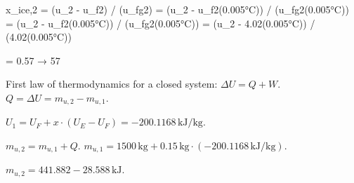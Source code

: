 x_ice,2 = (u_2 - u_f2) / (u_fg2)  
= (u_2 - u_f2(0.005°C)) / (u_fg2(0.005°C))  
= (u_2 - u_f2(0.005°C)) / (u_fg2(0.005°C))  
= (u_2 - 4.02(0.005°C)) / (4.02(0.005°C))  

= 0.57 → 57%

First law of thermodynamics for a closed system: \( \Delta U = Q + W \).  
\( Q = \Delta U = m_{u,2} - m_{u,1} \).  

\( U_1 = U_F + x \cdot (U_E - U_F) = -200.1168 \, \text{kJ/kg} \).  

\( m_{u,2} = m_{u,1} + Q \).  
\( m_{u,1} = 1500 \, \text{kg} + 0.15 \, \text{kg} \cdot (-200.1168 \, \text{kJ/kg}) \).  

\( m_{u,2} = 441.882 - 28.588 \, \text{kJ} \).